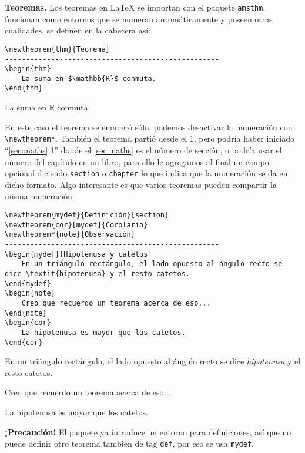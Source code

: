 \textbf{Teoremas.} Los teoremas en \LaTeX{} se importan con el paquete \texttt{amsthm}, funcionan como entornos que se numeran automáticamente y poseen otras cualidades, se definen en la cabecera así:
\begin{lstlisting}
\newtheorem{thm}{Teorema}
---------------------------------------------------
\begin{thm}
	La suma en $\mathbb{R}$ conmuta.
\end{thm}
\end{lstlisting}
\begin{thm}
	La suma en $\mathbb{R}$ conmuta.
\end{thm}
En este caso el teorema se enumeró sólo, podemos desactivar la numeración con \lstinline|\newtheorem*|. También el teorema partió desde el 1, pero podría haber iniciado ``\ref{sec:maths}.1'' donde el \ref{sec:maths} es el número de sección, o podría usar el número del capítulo en un libro, para ello le agregamos al final un campo opcional diciendo \texttt{section} o \texttt{chapter} lo que indica que la numeración se da en dicho formato. Algo interesante es que varios teoremas pueden compartir la misma numeración:
\begin{lstlisting}
\newtheorem{mydef}{Definición}[section]
\newtheorem{cor}[mydef]{Corolario}
\newtheorem*{note}{Observación}
---------------------------------------------------
\begin{mydef}[Hipotenusa y catetos]
	En un triángulo rectángulo, el lado opuesto al ángulo recto se dice \textit{hipotenusa} y el resto catetos.
\end{mydef}
\begin{note}
	Creo que recuerdo un teorema acerca de eso...
\end{note}
\begin{cor}
	La hipotenusa es mayor que los catetos.
\end{cor}
\end{lstlisting}
\begin{mydef}
	En un triángulo rectángulo, el lado opuesto al ángulo recto se dice \textit{hipotenusa} y el resto catetos.
\end{mydef}
\begin{note}
	Creo que recuerdo un teorema acerca de eso...
\end{note}
\begin{cor}
	La hipotenusa es mayor que los catetos.
\end{cor}
\textbf{¡Precaución!} El paquete ya introduce un entorno para definiciones, así que no puede definir otro teorema también de tag \texttt{def}, por eso se usa \texttt{mydef}.

